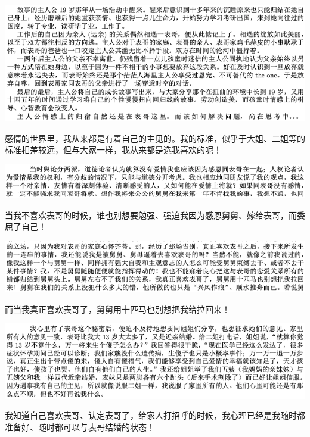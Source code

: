 \documentclass[9pt, b5paper]{article}
\begin{document}
\begin{center}
\includegraphics[width=.9\linewidth]{./pic/backups_plans_20210415_091659.png}
\end{center}

感情的世界里，我从来都是有着自己的主见的。我的标准，似乎于大姐、二姐等的标准相差较远，但与大家一样，我从来都是选我喜欢的呢！

\begin{center}
\includegraphics[width=.9\linewidth]{./pic/backups_plans_20210415_095344.png}
\end{center}

当我不喜欢表哥的时候，谁也别想要勉强、强迫我因为感恩舅舅、嫁给表哥，而委屈了自己！

\begin{center}
\includegraphics[width=.9\linewidth]{./pic/backups_plans_20210415_095418.png}
\end{center}

而当我真正喜欢表哥了，舅舅用十匹马也别想把我给拉回来！

\begin{center}
\includegraphics[width=.9\linewidth]{./pic/backups_plans_20210415_094432.png}
\end{center}

我知道自己喜欢表哥、认定表哥了，给家人打招呼的时候，我心理已经是我随时都准备好、随时都可以与表哥结婚的状态！
\end{document}
